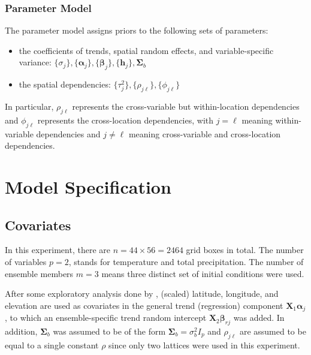 \documentclass{article}
\begin{document}
\subsubsection{Parameter Model}
The parameter model assigns priors to the following sets of parameters: 
\begin{itemize}
    \item the coefficients of trends, spatial random effects, and variable-specific variance: $\{\sigma_j \}, \{\boldsymbol{\alpha}_j \}, \{\boldsymbol{\beta}_j \}, \{\boldsymbol{h}_j\}, \boldsymbol{\Sigma}_b$
    \item the spatial dependencies: $\{\tau_j^2\}, \{\rho_{j\ell}\}, \{\phi_{j\ell}\}$
\end{itemize} 
In particular, $\rho_{j\ell}$ represents the cross-variable but within-location dependencies and $\phi_{j\ell}$ represents the cross-location dependencies, with $j = \ell$ meaning within-variable dependencies and $j \ne \ell$ meaning cross-variable and cross-location dependencies. 

\section{Model Specification}
\subsection{Covariates}
In this experiment, there are $n = 44 \times 56 = 2464$ grid boxes in total. The number of variables $p = 2$, stands for temperature and total precipitation. The number of ensemble members $m = 3$ means three distinct set of initial conditions were used.

After some exploratory analysis done by \cite{paper}, (scaled) latitude, longitude, and elevation are used as covariates in the general trend (regression) component $\boldsymbol{X}_1 \boldsymbol{\alpha}_j$, to which an ensemble-specific trend random intercept $\boldsymbol{X}_2 \boldsymbol{\beta}_{rj}$ was added.
In addition, $\boldsymbol{\Sigma}_b$ was assumed to be of the form $\boldsymbol{\Sigma}_b = \sigma_{b}^2 I_{p}$ and $\rho_{j\ell}$ are assumed to be equal to a single constant $\rho$ since only two lattices were used in this experiment.
\end{document}
